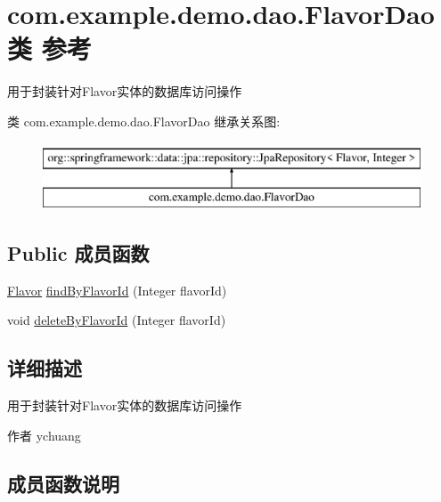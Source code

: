\hypertarget{interfacecom_1_1example_1_1demo_1_1dao_1_1_flavor_dao}{}\section{com.\+example.\+demo.\+dao.\+Flavor\+Dao类 参考}
\label{interfacecom_1_1example_1_1demo_1_1dao_1_1_flavor_dao}


用于封装针对\+Flavor实体的数据库访问操作  


类 com.\+example.\+demo.\+dao.\+Flavor\+Dao 继承关系图\+:\begin{figure}[H]
\begin{center}
\leavevmode
\includegraphics[height=2.000000cm]{interfacecom_1_1example_1_1demo_1_1dao_1_1_flavor_dao}
\end{center}
\end{figure}
\subsection*{Public 成员函数}
\begin{DoxyCompactItemize}
\item 
\mbox{\hyperlink{classcom_1_1example_1_1demo_1_1modular_1_1_flavor}{Flavor}} \mbox{\hyperlink{interfacecom_1_1example_1_1demo_1_1dao_1_1_flavor_dao_a8ddd9bd8d2d11277f36fa785c240869d}{find\+By\+Flavor\+Id}} (Integer flavor\+Id)
\item 
void \mbox{\hyperlink{interfacecom_1_1example_1_1demo_1_1dao_1_1_flavor_dao_a01357dc4f48ba97d62f94821499b6a07}{delete\+By\+Flavor\+Id}} (Integer flavor\+Id)
\end{DoxyCompactItemize}


\subsection{详细描述}
用于封装针对\+Flavor实体的数据库访问操作 

\begin{DoxyAuthor}{作者}
ychuang 
\end{DoxyAuthor}


\subsection{成员函数说明}
\mbox{\label{interfacecom_1_1example_1_1demo_1_1dao_1_1_flavor_dao_a01357dc4f48ba97d62f94821499b6a07}} 
